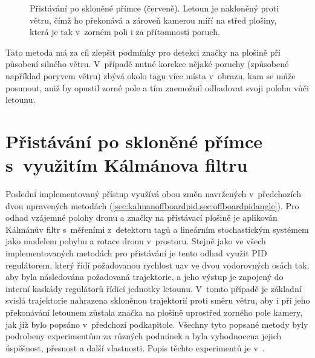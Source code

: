 \begin{figure}
            \caption[Přistávání po skloněné přímce]{Přistávání po skloněné přímce (červeně). Letoun je nakloněný proti větru, čímž ho překonává a zároveň kamerou míří na střed plošiny, která je tak v~zorném poli i za přítomnosti poruch.}
            \label{fig:offboardpidangle}
        \end{figure}
        

        Tato metoda má za cíl zlepšit podmínky pro detekci značky na plošině při působení silného větru. V~případě nutné korekce nějaké poruchy (způsobené například poryvem větru) zbývá okolo tagu více místa v~obrazu, kam se může posunout, aniž by opustil zorné pole a tím znemožnil odhadovat svoji polohu vůči letounu.
    \section{Přistávání po skloněné přímce s~využitím Kálmánova filtru} \label{sec:kalmanoffboardpidangle}
        Poslední implementovaný přístup využívá obou změn navržených v~předchozích dvou upravených metodách (\cref{sec:kalmanoffboardpid,sec:offboardpidangle}). Pro odhad vzájemné polohy dronu a značky na přistávací plošině je aplikován Kálmánův filtr s~měřeními z~detektoru tagů a lineárním stochastickým systémem jako modelem pohybu a rotace dronu v~prostoru. Stejně jako ve všech implementovaných metodách pro přistávání je tento odhad využit PID regulátorem, který řídí požadovanou rychlost \acrshort{uav} ve dvou vodorovných osách tak, aby byla následována požadovaná trajektorie, a jeho výstup je zapojený do interní kaskády regulátorů řídicí jednotky letounu. V~tomto případě je základní svislá trajektorie nahrazena skloněnou trajektorií proti směru větru, aby i při jeho překonávání letounem zůstala značka na plošině uprostřed zorného pole kamery, jak již bylo popsáno v~předchozí podkapitole. Všechny tyto popsané metody byly podrobeny experimentům za různých podmínek a byla vyhodnocena jejich úspěšnost, přesnost a další vlastnosti. Popis těchto experimentů je v~.